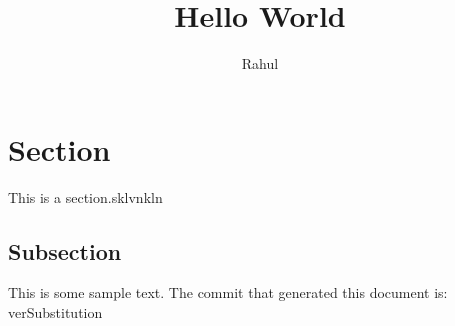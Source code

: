 \documentclass[12pt]{article}
\title{Hello World}
\author{Rahul}
\begin{document}
\maketitle

\section{Section}

This is a section.sklvnkln

\subsection{Subsection}

This is some sample text.
The commit that generated this document is: verSubstitution
\end{document}
